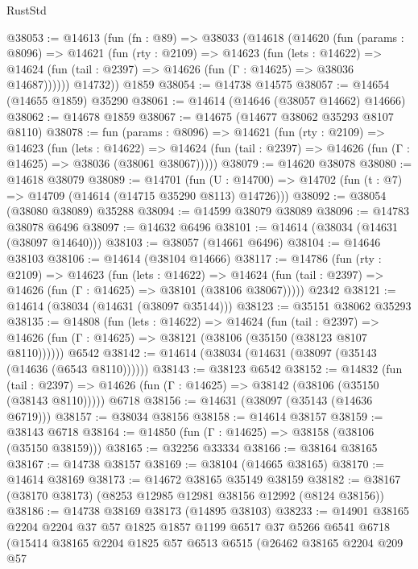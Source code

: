 \begin{lexlean}{RustStd}
\begin{coremodule}
@38053 := @14613
    (fun (fn : @89) =>
    @38033
      (@14618
        (@14620
          (fun (params : @8096) =>
          @14621
            (fun (rty : @2109) =>
            @14623
              (fun (lets : @14622) =>
              @14624 (fun (tail : @2397) => @14626 (fun (Γ : @14625) => @38036 @14687))))))
        @14732))
    @1859
@38054 := @14738 @14575
@38057 := @14654 (@14655 @1859) @35290
@38061 := @14614 (@14646 (@38057 @14662) @14666)
@38062 := @14678 @1859
@38067 := @14675 (@14677 @38062 @35293 @8107 @8110)
@38078 := fun (params : @8096) =>
  @14621
    (fun (rty : @2109) =>
    @14623
      (fun (lets : @14622) =>
      @14624 (fun (tail : @2397) => @14626 (fun (Γ : @14625) => @38036 (@38061 @38067)))))
@38079 := @14620 @38078
@38080 := @14618 @38079
@38089 := @14701
    (fun (U : @14700) => @14702 (fun (t : @7) => @14709 (@14614 (@14715 @35290 @8113) @14726)))
@38092 := @38054 (@38080 @38089) @35288
@38094 := @14599 @38079 @38089
@38096 := @14783 @38078 @6496
@38097 := @14632 @6496
@38101 := @14614 (@38034 (@14631 (@38097 @14640)))
@38103 := @38057 (@14661 @6496)
@38104 := @14646 @38103
@38106 := @14614 (@38104 @14666)
@38117 := @14786
    (fun (rty : @2109) =>
    @14623
      (fun (lets : @14622) =>
      @14624 (fun (tail : @2397) => @14626 (fun (Γ : @14625) => @38101 (@38106 @38067)))))
    @2342
@38121 := @14614 (@38034 (@14631 (@38097 @35144)))
@38123 := @35151 @38062 @35293
@38135 := @14808
    (fun (lets : @14622) =>
    @14624
      (fun (tail : @2397) =>
      @14626 (fun (Γ : @14625) => @38121 (@38106 (@35150 (@38123 @8107 @8110))))))
    @6542
@38142 := @14614 (@38034 (@14631 (@38097 (@35143 (@14636 (@6543 @8110))))))
@38143 := @38123 @6542
@38152 := @14832
    (fun (tail : @2397) => @14626 (fun (Γ : @14625) => @38142 (@38106 (@35150 (@38143 @8110)))))
    @6718
@38156 := @14631 (@38097 (@35143 (@14636 @6719)))
@38157 := @38034 @38156
@38158 := @14614 @38157
@38159 := @38143 @6718
@38164 := @14850 (fun (Γ : @14625) => @38158 (@38106 (@35150 @38159)))
@38165 := @32256 @33334
@38166 := @38164 @38165
@38167 := @14738 @38157
@38169 := @38104 (@14665 @38165)
@38170 := @14614 @38169
@38173 := @14672 @38165 @35149 @38159
@38182 := @38167 (@38170 @38173) (@8253 @12985 @12981 @38156 @12992 (@8124 @38156))
@38186 := @14738 @38169 @38173 (@14895 @38103)
@38233 := @14901
    @38165
    @2204
    @2204
    @37
    @57
    @1825
    @1857
    @1199
    @6517
    @37
    @5266
    @6541
    @6718
    (@15414
      @38165
      @2204
      @1825
      @57
      @6513
      @6515
      (@26462
        @38165
        @2204
        @209
        @57

\end{coremodule}
\end{lexlean}
